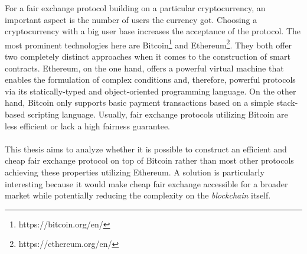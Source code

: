 \documentclass{cacthesis}
\newcounter{protocol}
\begin{document}
        For a fair exchange protocol building on a particular cryptocurrency, an important aspect is the number of users the currency got. Choosing a cryptocurrency with a big user base increases the acceptance of the protocol. The most prominent technologies here are Bitcoin\footnote{https://bitcoin.org/en/} and Ethereum\footnote{https://ethereum.org/en/}. They both offer two completely distinct approaches when it comes to the construction of smart contracts. Ethereum, on the one hand, offers a powerful virtual machine that enables the formulation of complex conditions and, therefore, powerful protocols via its statically-typed and object-oriented programming language. On the other hand, Bitcoin only supports basic payment transactions based on a simple stack-based scripting language. Usually, fair exchange protocols utilizing Bitcoin are less efficient or lack a high fairness guarantee. \\\\
        This thesis aims to analyze whether it is possible to construct an efficient and cheap fair exchange protocol on top of Bitcoin rather than most other protocols achieving these properties utilizing Ethereum. A solution is particularly interesting because it would make cheap fair exchange accessible for a broader market while potentially reducing the complexity on the \textit{blockchain} itself.
        
\end{document}
